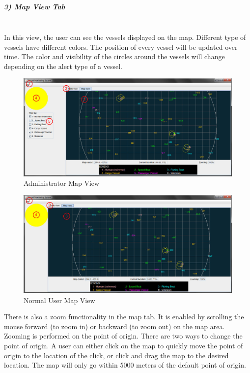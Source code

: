 \documentclass{article}
\begin{document}
\break
\subparagraph{3) Map View Tab \\ \\}
In this view, the user can see the vessels displayed on the map. Different type of vessels have different colors. The position of every vessel will be updated over time. The color and visibility of the circles around the vessels will change depending on the alert type of a vessel.
	
	\begin{figure}[!htb]
	\caption{Administrator Map View}
	\centering
	\includegraphics[scale=0.36]{images/userManual3_admin.jpg}
	\end{figure}

	\begin{figure}[!htb]
	\caption{Normal User Map View}
	\centering
	\includegraphics[scale=0.36]{images/userManual3_user.jpg}
	\end{figure}

There is also a zoom functionality in the map tab. It is enabled by scrolling the mouse forward (to zoom in) or backward (to zoom out) on the map area. Zooming is performed on the point of origin. There are two ways to change the point of origin. A user can either click on the map to quickly move the point of origin to the location of the click, or click and drag the map to the desired location. The map will only go within 5000 meters of the default point of origin.
\end{document}
